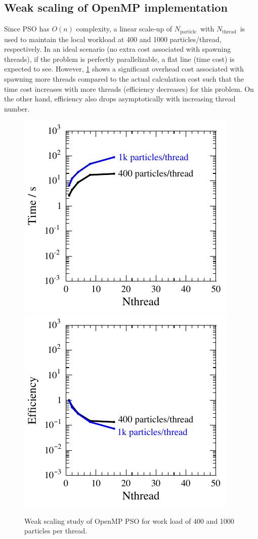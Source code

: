 \documentclass[conference, 10pt]{IEEEtran}
\newcommand{\N}[1]{\ensuremath{N_\text{#1}}}
\newcommand{\Np}{\N{particle}}
\newcommand{\Nthreads}{\N{thread}}
\begin{document}
\subsection{Weak scaling of OpenMP implementation}

Since PSO has $O(n)$ complexity, a linear scale-up of \Np\ with \Nthreads\ is used to maintain the local workload at 400 and 1000 particles/thread, respectively.
In an ideal scenario (no extra cost associated with spawning threads), if the problem is perfectly parallelizable, a flat line (time cost) is expected to see.
However, \cref{fig: omp_weak} shows a significant overhead cost associated with spawning more threads compared to the actual calculation cost such that the time cost increases with more threads (efficiency decreases) for this problem.
On the other hand, efficiency also drops asymptotically with increasing thread number.

\begin{figure}[h!]
\centering
\includegraphics[width=0.45\linewidth]{omp_weak_time} 
\includegraphics[width=0.45\linewidth]{omp_weak_effi}
\caption{Weak scaling study of OpenMP PSO for work load of 400 and 1000 particles per thread.}
\label{fig: omp_weak}
\end{figure}
\end{document}
